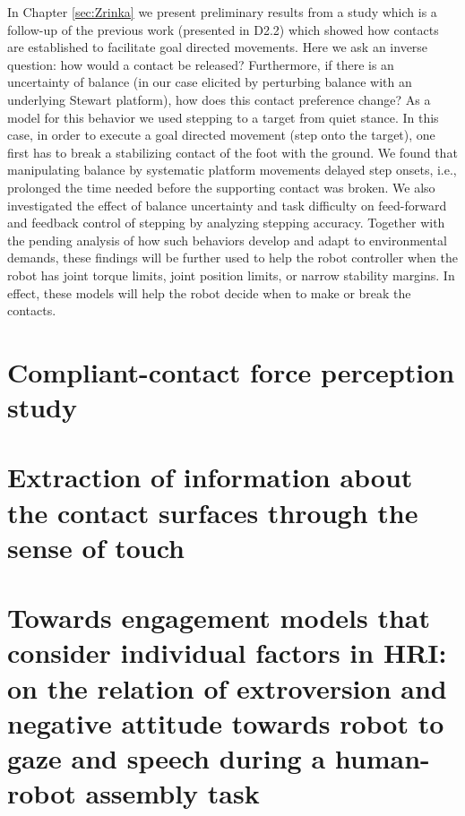 \documentclass[12pt,a4paper,twoside]{report}
\begin{document}
In Chapter \ref{sec:Zrinka} we present preliminary results from a study which is a follow-up of the previous work (presented in D2.2) which showed how contacts are established to facilitate goal directed movements. Here we ask an inverse question: how would a contact be released? Furthermore, if there is an uncertainty of balance (in our case elicited by perturbing balance with an underlying Stewart platform), how does this contact preference change? As a model for this behavior we used stepping to a target from quiet stance. In this case, in order to execute a goal directed movement (step onto the target), one first has to break a stabilizing contact of the foot with the ground. We found that manipulating balance by systematic platform movements delayed step onsets, i.e., prolonged the time needed before the supporting contact was broken. We also investigated the effect of balance uncertainty and task difficulty on feed-forward and feedback control of stepping by analyzing stepping  accuracy. Together with the pending analysis of how such behaviors develop and adapt to environmental demands, these findings will be further used to help the robot controller when the robot has joint torque limits, joint position limits, or narrow stability margins. In effect, these models will help the robot decide when to make or break the contacts.


\newpage{}
\chapter{Compliant-contact force perception study}\label{sec:Chie}
\setcounter{figure}{0}

\clearpage{}

\chapter{Extraction of information about the contact surfaces through the sense of touch}\label{sec:Roberta}
\setcounter{figure}{0}

\clearpage{}

\chapter{Towards engagement models that consider individual factors in HRI: on the relation of extroversion and negative attitude towards robot to gaze and speech during a human-robot assembly task}\label{sec:Serena}
\setcounter{figure}{0}

\clearpage{}
\end{document}
